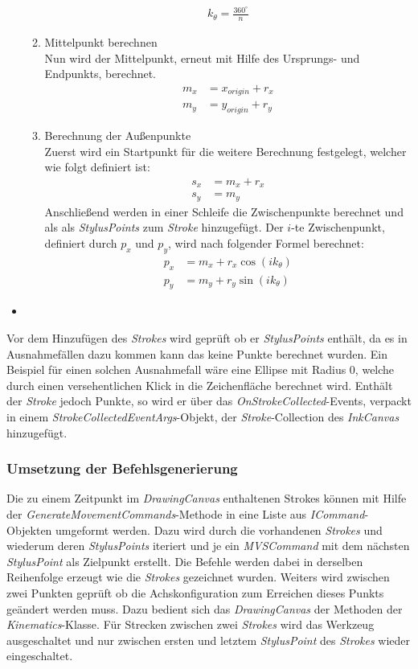 \begin{itemize}
\begin{enumerate}
\begin{align}
k_{\theta} = \frac{360^\circ}{n}
\end{align}
\item Mittelpunkt berechnen\\
Nun wird der Mittelpunkt, erneut mit Hilfe des Ursprungs- und Endpunkts, berechnet.
\begin{align}
m_x &= x_{origin} + r_x\\
m_y &= y_{origin} + r_y
\end{align}
\item Berechnung der Außenpunkte\\
Zuerst wird ein Startpunkt für die weitere Berechnung festgelegt, welcher wie folgt definiert ist:
\begin{align}
s_x &= m_x + r_x\\
s_y &= m_y
\end{align}
Anschließend werden in einer Schleife die Zwischenpunkte berechnet und als als \textit{StylusPoints} zum \textit{Stroke} hinzugefügt. Der $i$-te Zwischenpunkt, definiert durch $p_x$ und $p_y$, wird nach folgender Formel berechnet:
\begin{align}
p_x &= m_x + r_x \cos(ik_\theta)\\
p_y &= m_y + r_y \sin(ik_\theta)
\end{align}
\end{enumerate}

\item
\end{itemize}
Vor dem Hinzufügen des \textit{Strokes} wird geprüft ob er \textit{StylusPoints} enthält, da es in Ausnahmefällen dazu kommen kann das keine Punkte berechnet wurden. Ein Beispiel für einen solchen Ausnahmefall wäre eine Ellipse mit Radius 0, welche durch einen versehentlichen Klick in die Zeichenfläche berechnet wird. Enthält der \textit{Stroke} jedoch Punkte, so wird er über das \textit{OnStrokeCollected}-Events, verpackt in einem \textit{StrokeCollectedEventArgs}-Objekt, der \textit{Stroke}-Collection des \textit{InkCanvas} hinzugefügt. 

\subsubsection{Umsetzung der Befehlsgenerierung}

Die zu einem Zeitpunkt im \textit{DrawingCanvas} enthaltenen Strokes können mit Hilfe der \textit{GenerateMovementCommands}-Methode in eine Liste aus \textit{ICommand}-Objekten umgeformt werden. Dazu wird durch die vorhandenen \textit{Strokes} und wiederum deren \textit{StylusPoints} iteriert und je ein \textit{MVSCommand} mit dem nächsten \textit{StylusPoint} als Zielpunkt erstellt. 
Die Befehle werden dabei in derselben Reihenfolge erzeugt wie die \textit{Strokes} gezeichnet wurden. Weiters wird zwischen zwei Punkten geprüft ob die Achskonfiguration zum Erreichen dieses Punkts geändert werden muss.
Dazu bedient sich das \textit{DrawingCanvas} der Methoden der \textit{Kinematics}-Klasse.
Für Strecken zwischen zwei \textit{Strokes} wird das Werkzeug ausgeschaltet und nur zwischen ersten und letztem \textit{StylusPoint} des \textit{Strokes} wieder eingeschaltet.


